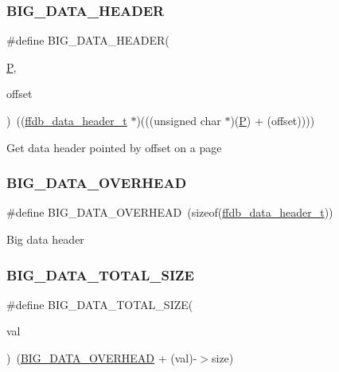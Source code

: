 \subsubsection{\texorpdfstring{BIG\_DATA\_HEADER}{BIG\_DATA\_HEADER}}
{\footnotesize\ttfamily \#define B\+I\+G\+\_\+\+D\+A\+T\+A\+\_\+\+H\+E\+A\+D\+ER(\begin{DoxyParamCaption}\item[{}]{\mbox{\hyperlink{adat__devel_2lib_2hadron_2operator__name__util_8cc_aef94be98e2c9e4a4dece75f60ca9792c}{P}},  }\item[{}]{offset }\end{DoxyParamCaption})~((\mbox{\hyperlink{adat-devel_2other__libs_2filedb_2filehash_2ffdb__page_8h_a66feb3f11a241f917003ff5e94af8a88}{ffdb\+\_\+data\+\_\+header\+\_\+t}} $\ast$)(((unsigned char $\ast$)(\mbox{\hyperlink{adat__devel_2lib_2hadron_2operator__name__util_8cc_aef94be98e2c9e4a4dece75f60ca9792c}{P}}) + (offset))))}

Get data header pointed by offset on a page \mbox{\label{adat-devel_2other__libs_2filedb_2filehash_2ffdb__page_8h_a2155fff348f0c63ac324198613297015}} 
\subsubsection{\texorpdfstring{BIG\_DATA\_OVERHEAD}{BIG\_DATA\_OVERHEAD}}
{\footnotesize\ttfamily \#define B\+I\+G\+\_\+\+D\+A\+T\+A\+\_\+\+O\+V\+E\+R\+H\+E\+AD~(sizeof(\mbox{\hyperlink{adat-devel_2other__libs_2filedb_2filehash_2ffdb__page_8h_a66feb3f11a241f917003ff5e94af8a88}{ffdb\+\_\+data\+\_\+header\+\_\+t}}))}

Big data header \mbox{\label{adat-devel_2other__libs_2filedb_2filehash_2ffdb__page_8h_a7adba7ce55957d6a07b18f3c758592c5}} 
\subsubsection{\texorpdfstring{BIG\_DATA\_TOTAL\_SIZE}{BIG\_DATA\_TOTAL\_SIZE}}
{\footnotesize\ttfamily \#define B\+I\+G\+\_\+\+D\+A\+T\+A\+\_\+\+T\+O\+T\+A\+L\+\_\+\+S\+I\+ZE(\begin{DoxyParamCaption}\item[{}]{val }\end{DoxyParamCaption})~(\mbox{\hyperlink{adat__devel_2other__libs_2filedb_2filehash_2ffdb__page_8h_a2155fff348f0c63ac324198613297015}{B\+I\+G\+\_\+\+D\+A\+T\+A\+\_\+\+O\+V\+E\+R\+H\+E\+AD}} + (val)-\/$>$size)}

